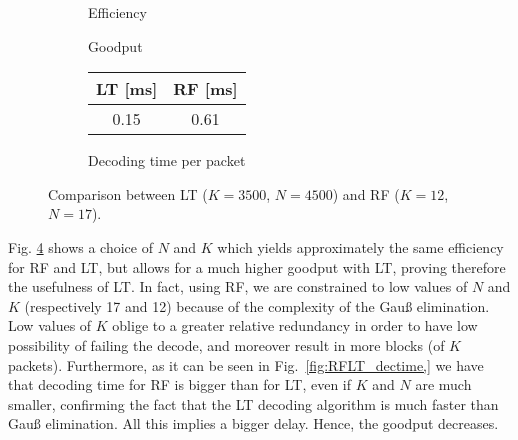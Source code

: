 \begin{figure}[!h]
\centering
\begin{subfigure}{0.23\textwidth}
	\captionsetup{justification=centering,font=scriptsize}
	\centering
	\setlength\fwidth{\textwidth}
	\setlength{}
	
	\caption{Efficiency}
	\label{fig:RF_eff}
\end{subfigure}\hspace{2em}%
\begin{subfigure}{0.23\textwidth}
	\captionsetup{justification=centering,font=scriptsize}
	\centering
	\setlength\fwidth{\textwidth}
	\setlength{}
	
	\caption{Goodput}
	\label{fig:RF_good}
\end{subfigure}\hspace{2em}%
\begin{subfigure}{0.23\textwidth}
	\captionsetup{justification=centering,font=scriptsize}
	\small
	\centering
	\begin{tabular}[c]{c|c}
		LT [ms] & RF [ms] \\ \hline
		0.15 & 0.61 \\
	\end{tabular}
	\caption{Decoding time per packet}
	\label{fig:RFLT_dectime}
\end{subfigure}
\caption{Comparison between LT ($K=3500$, $N=4500$) and RF ($K=12$, $N=17$).}
\label{fig:RFLT}
\end{figure}

Fig. \ref{fig:RFLT} shows a choice of $N$ and $K$ which yields approximately the same efficiency for RF and LT, but allows for a much higher goodput with LT, proving therefore the usefulness of LT. In fact, using RF, we are constrained to low values of $N$ and $K$ (respectively 17 and 12) because of the complexity of the Gau{\ss} elimination. Low values of $K$ oblige to a greater relative redundancy in order to have low possibility of failing the decode, and moreover result in more blocks (of $K$ packets). Furthermore, as it can be seen in Fig.~\ref{fig:RFLT_dectime,} we have that decoding time for RF is bigger than for LT, even if $K$ and $N$ are much smaller, confirming the fact that the LT decoding algorithm is much faster than Gau{\ss} elimination. All this implies a bigger delay. Hence, the goodput decreases.
